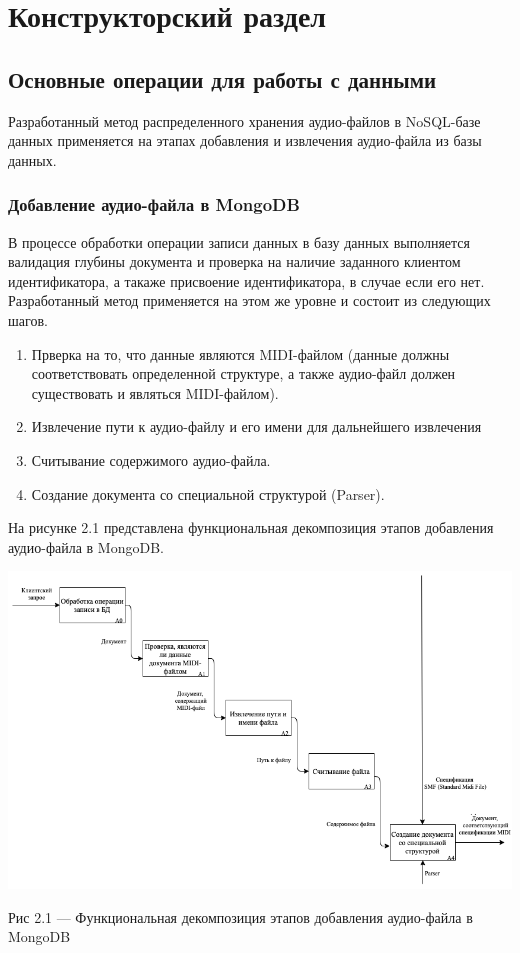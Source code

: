 \chapter{Конструкторский раздел}
\label{cha:design}

\section{Основные операции для работы с данными}

Разработанный метод распределенного хранения аудио-файлов в NoSQL-базе данных применяется на этапах добавления и извлечения аудио-файла из базы данных. 

\subsection{Добавление аудио-файла в MongoDB}

В процессе обработки операции записи данных в базу данных выполняется валидация глубины документа и проверка на наличие заданного клиентом идентификатора, а такаже присвоение идентификатора, в случае если его нет. Разработанный метод применяется на этом же уровне и состоит из следующих шагов.
\begin{enumerate}
\item Прверка на то, что данные являются MIDI-файлом (данные должны соответствовать определенной структуре, а также аудио-файл должен существовать и являться MIDI-файлом).
\item Извлечение пути к аудио-файлу и его имени для дальнейшего извлечения
\item Считывание содержимого аудио-файла.
\item Создание документа со специальной структурой (Parser).
\end{enumerate}

На рисунке 2.1 представлена функциональная декомпозиция этапов добавления аудио-файла в MongoDB.

\begin{center}
		\includegraphics[scale=0.55]{tex/img/DecomposeInsert1.png}
		
			Рис 2.1 — Функциональная декомпозиция этапов добавления аудио-файла в MongoDB
\end{center} 

